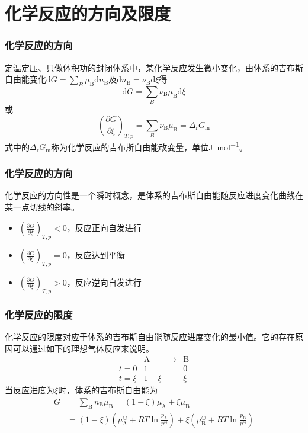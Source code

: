 \section{化学反应的方向及限度}


\begin{frame}
    \frametitle{化学反应的方向}

    \large 定温定压、只做体积功的封闭体系中，某化学反应发生微小变化，由体系的吉布斯自由能变化$\mathrm{d}G=\sum_B{\mu_\mathrm{B}\mathrm{d}n_\mathrm{B}}$及$\mathrm{d}n_\mathrm{B}=\nu_\mathrm{B}\mathrm{d}\xi$得
    \[
        \mathrm{d}G=\sum_B{\nu_\mathrm{B}\mu_\mathrm{B}}\mathrm{d}\xi
    \]
    或
    \[
        \left(\frac{\partial G}{\partial \xi}\right)_{T,p}=\sum_B{\nu_\mathrm{B}\mu_\mathrm{B}}=\Delta _\mathrm{r}G_\mathrm{m}
    \]
    式中的$\Delta _\mathrm{r}G_\mathrm{m}$称为化学反应的吉布斯自由能改变量，单位\si{J.mol^{-1}}。

\end{frame}


\begin{frame}
    \frametitle{化学反应的方向}

            化学反应的方向性是一个瞬时概念，是体系的吉布斯自由能随反应进度变化曲线在某一点切线的斜率。
            \begin{itemize}
                \item[\bullet] $\left(\frac{\partial G}{\partial \xi}\right)_{T,p}<0$，反应正向自发进行
                \item[\bullet] $\left(\frac{\partial G}{\partial \xi}\right)_{T,p}=0$，反应达到平衡
                \item[\bullet] $\left(\frac{\partial G}{\partial \xi}\right)_{T,p}>0$，反应逆向自发进行
            \end{itemize}
\end{frame}


\begin{frame}
    \frametitle{化学反应的限度}

    化学反应的限度对应于体系的吉布斯自由能随反应进度变化的最小值。它的存在原因可以通过如下的理想气体反应来说明。    
    \[
        \begin{array}{rccc} 
            & \mathrm{A}& \longrightarrow & \mathrm{B} \\
            t=0 & 1 & & 0 \\
            t=\xi & 1-\xi & & \xi
            \end{array}
    \]
    当反应进度为$\xi$时，体系的吉布斯自由能为
    \[
        \begin{aligned}
            G &=\sum_{\mathrm{B}} n_{\mathrm{B}} \mu_{\mathrm{B}}=(1-\xi) \mu_{\mathrm{A}}+\xi \mu_{\mathrm{B}} \\
            &=(1-\xi)\left(\mu_{\mathrm{A}}^{\ominus}+R T \ln \frac{p_{\mathrm{A}}}{p^{\ominus}}\right)+\xi\left(\mu_{\mathrm{B}}^{\ominus}+R T \ln \frac{p_{\mathrm{B}}}{p^{\ominus}}\right)
            \end{aligned}
    \]
  
\end{frame}

